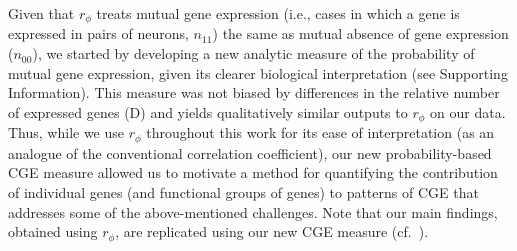 \documentclass[10pt,letterpaper]{article}
\begin{document}

Given that $r_\phi$ treats mutual gene expression (i.e., cases in which a gene is expressed in pairs of neurons, $n_{11}$) the same as mutual absence of gene expression ($n_{00}$), we started by developing a new analytic measure of the probability of mutual gene expression, given its clearer biological interpretation (see Supporting Information).
This measure was not biased by differences in the relative number of expressed genes (D) and yields qualitatively similar outputs to $r_\phi$ on our data.
Thus, while we use $r_\phi$ throughout this work for its ease of interpretation (as an analogue of the conventional correlation coefficient), our new probability-based CGE measure allowed us to motivate a method for quantifying the contribution of individual genes (and functional groups of genes) to patterns of CGE that addresses some of the above-mentioned challenges.
Note that our main findings, obtained using $r_\phi$, are replicated using our new CGE measure (cf.~).
\end{document}
